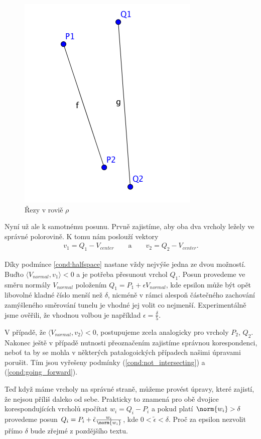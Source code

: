 \begin{figure}[ht]
    \centering
    \includegraphics{img/segments_basic.png}
    \caption{Řezy v roviě $ \rho $}
  \centering
  \label{fig:segments_basic}
\end{figure}

Nyní už ale k samotnému posunu. Prvně zajistíme, aby oba dva vrcholy ležely ve
správné polorovině. K tomu nám poslouží vektory
\begin{align*}
    v_1 = Q_1 - V_{center} \qquad\text{a}\qquad v_2 = Q_2 - V_{center}.
\end{align*}

Díky podmínce \ref{cond:halfspace} nastane vždy nejvýše jedna
ze dvou možností. Buďto $ \langle V_{normal}, v_1\rangle < 0 $ a je potřeba
přesunout vrchol $ Q_1 $. Posun provedeme ve směru normály $ V_{normal} $ položením
$ Q_1 = P_1 + \epsilon V_{normal} $, kde epsilon může být opět libovolné
kladné číslo menší než $ \delta $, nicméně v rámci alespoň částečného zachování
zamýšleného směrování tunelu je vhodné jej volit co nejmenší. Experimentálně
jsme ověřili, že vhodnou volbou je například $ \epsilon = \frac{\delta}{5} $.

V případě, že $ \langle V_{normal}, v_2\rangle < 0 $, postupujeme zcela analogicky
pro vrcholy $ P_2 $, $ Q_2 $. Nakonec ještě v případě nutnosti přeoznačením
zajistíme správnou korespondenci, neboť ta by se mohla v některých patalogoických
případech našimi úpravami porušit. Tím jsou vyřešeny podmínky
(\ref{cond:not_intersecting}) a (\ref{cond:going_forward}).

Teď když máme vrcholy na správné straně, můžeme provést úpravy, které zajistí,
že nejsou příliš daleko od sebe. Prakticky to znamená pro obě dvojice
korespondujících vrcholů spočítat $ w_i = Q_i - P_i $ a pokud platí
$ \norm{w_i} > \delta $ provedeme posun
$ Q_i = P_i + \tilde{\epsilon} \frac{w_i}{\norm{w_i}} $, kde
$ 0 < \tilde{\epsilon} < \delta $. Proč za epsilon nezvolit přímo $ \delta $
bude zřejmé z pozdějšího textu.

